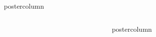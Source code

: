 \documentclass[final,hyperref={pdfpagelabels=false}]{beamer}
\newlength{\columnheight}
\begin{document}
\begin{frame}
\begin{columns}
\begin{column}{1\textwidth}
\begin{beamercolorbox}[center,wd=\textwidth]{postercolumn}
\begin{minipage}[T]{.95\textwidth}
\end{minipage}
\end{beamercolorbox}



\vspace{2ex}
\begin{columns}[T]

\begin{column}{.016\textwidth}
\end{column}

\begin{column}{.484\textwidth}
\begin{beamercolorbox}[center,wd=\textwidth]{postercolumn}
\begin{minipage}[T]{.95\textwidth}  %


\end{minipage}
\end{beamercolorbox}
\end{column}
\end{columns}
\end{column}
\end{columns}
\end{frame}
\end{document}
